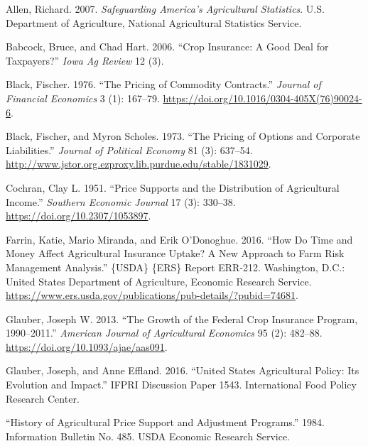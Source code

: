\documentclass[
  letterpaper,
  DIV=11,
  numbers=noendperiod]{scrreprt}
\newlength{\cslhangindent}
\newlength{\cslentryspacingunit} %
\newenvironment{CSLReferences}[2] %
 {%
  \setlength{\parindent}{0pt}
  \ifodd #1
  \let\oldpar\par
  \def\par{\hangindent=\cslhangindent\oldpar}
  \fi
  \setlength{\parskip}{#2\cslentryspacingunit}
 }%
 {}
\begin{document}

\hypertarget{refs}{}
\begin{CSLReferences}{1}{0}
\leavevmode{}%
Allen, Richard. 2007. \emph{Safeguarding America's Agricultural
Statistics}. U.S. Department of Agriculture, National Agricultural
Statistics Service.

\leavevmode{}%
Babcock, Bruce, and Chad Hart. 2006. {``Crop Insurance: A Good Deal for
Taxpayers?''} \emph{Iowa Ag Review} 12 (3).

\leavevmode{}%
Black, Fischer. 1976. {``The Pricing of Commodity Contracts.''}
\emph{Journal of Financial Economics} 3 (1): 167--79.
\url{https://doi.org/10.1016/0304-405X(76)90024-6}.

\leavevmode{}%
Black, Fischer, and Myron Scholes. 1973. {``The Pricing of Options and
Corporate Liabilities.''} \emph{Journal of Political Economy} 81 (3):
637--54.
\url{http://www.jstor.org.ezproxy.lib.purdue.edu/stable/1831029}.

\leavevmode{}%
Cochran, Clay L. 1951. {``Price Supports and the Distribution of
Agricultural Income.''} \emph{Southern Economic Journal} 17 (3):
330--38. \url{https://doi.org/10.2307/1053897}.

\leavevmode{}%
Farrin, Katie, Mario Miranda, and Erik O'Donoghue. 2016. {``How Do Time
and Money Affect Agricultural Insurance Uptake? A New Approach to Farm
Risk Management Analysis.''} \{USDA\} \{ERS\} Report {ERR}-212.
Washington, D.C.: United States Department of Agriculture, Economic
Research Service.
\url{https://www.ers.usda.gov/publications/pub-details/?pubid=74681}.

\leavevmode{}%
Glauber, Joseph W. 2013. {``The Growth of the Federal Crop Insurance
Program, 1990--2011.''} \emph{American Journal of Agricultural
Economics} 95 (2): 482--88. \url{https://doi.org/10.1093/ajae/aas091}.

\leavevmode{}%
Glauber, Joseph, and Anne Effland. 2016. {``United States Agricultural
Policy: Its Evolution and Impact.''} {IFPRI} Discussion Paper 1543.
International Food Policy Research Center.

\leavevmode{}%
{``History of Agricultural Price Support and Adjustment Programs.''}
1984. Information Bulletin No. 485. {USDA} Economic Research Service.


\end{CSLReferences}
\end{document}
